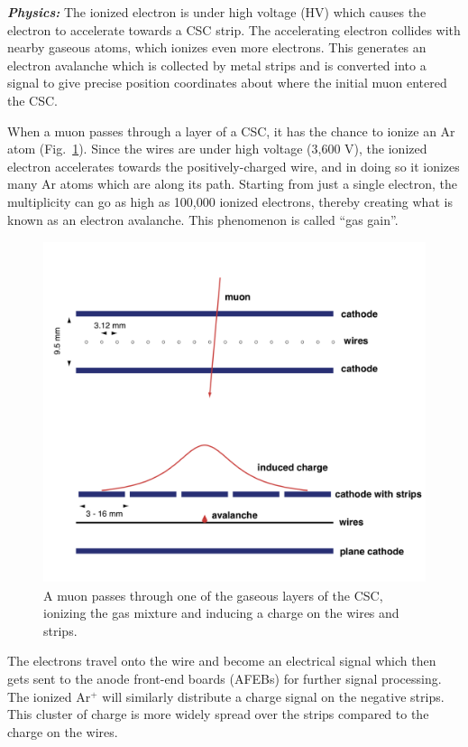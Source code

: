 \textit{\textbf{Physics:}}
The ionized electron is under high voltage (HV) which causes the electron to accelerate towards a CSC strip.
The accelerating electron collides with nearby gaseous atoms, which ionizes even more electrons.
This generates an electron avalanche which is collected by metal strips and is converted into a signal to give precise position coordinates about where the initial muon entered the CSC.

When a muon passes through a layer of a CSC, it has the chance to ionize an Ar atom (Fig.~\ref{fig:elec_avalanche}).
Since the wires are under high voltage (3,600 V), the ionized electron accelerates towards the positively-charged wire, and in doing so it ionizes many Ar atoms which are along its path. 
Starting from just a single electron, the multiplicity can go as high as 100,000 ionized electrons, thereby creating what is known as an electron avalanche. 
This phenomenon is called ``gas gain''.
\begin{figure}[pbth]
\centering
\includegraphics[width=15cm,height=10cm,keepaspectratio]{figures/cms/muonsys/csc_elec_avalanche_old.png}
    \caption{
    A muon passes through one of the gaseous layers of the CSC, ionizing the gas mixture and inducing a charge on the wires and strips. 
    }
    \label{fig:elec_avalanche}
\end{figure}
The electrons travel onto the wire and become an electrical signal which then gets sent to the anode front-end boards (AFEBs) for further signal processing.
The ionized Ar$^+$ will similarly distribute a charge signal on the negative strips.
This cluster of charge is more widely spread over the strips compared to the charge on the wires.
